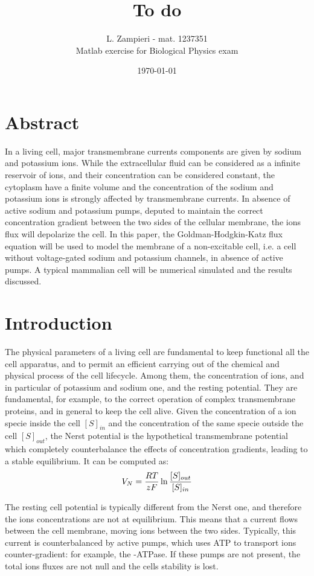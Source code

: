 \documentclass[11pt,a4 paper]{article}
\title{To do}
\author{L. Zampieri - mat. 1237351\\Matlab exercise for Biological Physics exam}
\date{\today}
\let\oldfrac\frac
\renewcommand{\frac}[3][d]{\ifthenelse{\equal{#1}{d}}{\oldfrac{#2}{#3}}{\nicefrac{#2}{#3}}}
\begin{document}
    
\maketitle

\section*{Abstract}
In a living cell, major transmembrane currents components are given by sodium and potassium ions. While the extracellular fluid can be considered as a infinite reservoir of ions, and their concentration can be considered constant, the cytoplasm have a finite volume and the concentration of the sodium and potassium ions is strongly affected by transmembrane currents. In absence of active sodium and potassium pumps, deputed to maintain the correct concentration gradient between the two sides of the cellular membrane, the ions flux will depolarize the cell. In this paper, the Goldman-Hodgkin-Katz flux equation will be used to model the membrane of a non-excitable cell, i.e. a cell without voltage-gated sodium and potassium channels, in absence of active pumps. A typical mammalian cell will be numerical simulated and the results discussed.

\section{Introduction}
The physical parameters of a living cell are fundamental to keep functional all the cell apparatus, and to permit an efficient carrying out of the chemical and physical process of the cell lifecycle. Among them, the concentration of ions, and in particular of potassium and sodium one, and the resting potential. They are fundamental, for example, to the correct operation of complex transmembrane proteins, and in general to keep the cell alive. Given the concentration of a ion specie inside the cell $[S]_{in}$ and the concentration of the same specie outside the cell $[S]_{out}$, the Nerst potential is the hypothetical transmembrane potential which completely counterbalance the effects of concentration gradients, leading to a stable equilibrium. It can be computed as:
\begin{align*}
    V_N = \frac{RT}{zF} \ln\frac{[S]_{out}}{[S]_{in}}
\end{align*}

The resting cell potential is typically different from the Nerst one, and therefore the ions concentrations are not at equilibrium. This means that a current flows between the cell membrane, moving ions between the two sides. Typically, this current is counterbalanced by active pumps, which uses ATP to transport ions counter-gradient: for example, the -ATPase. If these pumps are not present, the total ions fluxes are not null and the cells stability is lost.
\end{document}
